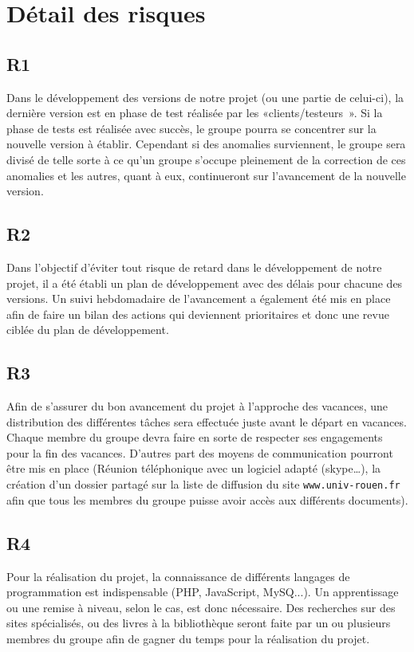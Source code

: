 \documentclass[a4paper,11pt,french]{article}
\begin{document}
\section{Détail des risques}

\subsection*{R1}
Dans le développement des versions de notre projet (ou une partie de celui-ci),
la dernière version est en phase de test réalisée par les «clients/testeurs ».
Si la phase de tests est réalisée avec succès, le groupe pourra se concentrer
sur la nouvelle version à établir. Cependant si des anomalies surviennent, le
groupe sera divisé de telle sorte à ce qu’un groupe s’occupe pleinement de la
correction de ces anomalies et les autres, quant à eux, continueront sur
l’avancement de la nouvelle version.

\subsection*{R2}
Dans l’objectif d’éviter tout risque de retard dans le développement de notre
projet, il a été établi un plan de développement avec des délais pour chacune
des versions. Un suivi hebdomadaire de l’avancement a également été mis en place
afin de faire un bilan des actions qui deviennent prioritaires et donc une revue
ciblée du plan de développement.

\subsection*{R3}
Afin de s’assurer du bon avancement du projet à l’approche des vacances, une
distribution des différentes tâches sera effectuée juste avant le départ en
vacances. Chaque membre du groupe devra faire en sorte de respecter ses
engagements pour la fin des vacances. D’autres part des moyens de communication
pourront être mis en place (Réunion téléphonique avec un logiciel adapté
(skype…), la création d’un dossier partagé sur la liste de diffusion du site
\texttt{www.univ-rouen.fr} afin que tous les membres du groupe puisse avoir
accès aux différents documents).

\subsection*{R4}
Pour la réalisation du projet, la connaissance de différents langages de
programmation est indispensable (PHP, JavaScript, MySQ...). Un apprentissage ou
une remise à niveau, selon le cas, est donc nécessaire. Des recherches sur des
sites spécialisés, ou des livres à la bibliothèque seront faite par un ou
plusieurs membres du groupe afin de gagner du temps pour la réalisation du
projet.
\end{document}
